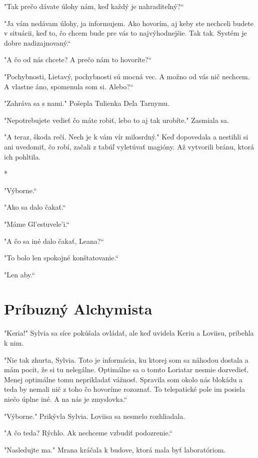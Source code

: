 \documentclass{book}
\begin{document}
"$ $Tak prečo dávate úlohy nám, keď každý je nahraditeľný?“

"$ $Ja vám nedávam úlohy, ja informujem. Ako hovorím, aj keby ste nechceli budete v situácii, keď to, čo chcem bude pre vás to najvýhodnejšie. Tak tak. Systém je dobre nadizajnovaný.“

"$ $A čo od nás chcete? A prečo nám to hovoríte?“

"$ $Pochybnosti, Lietavý, pochybnosti sú mocná vec. A možno od vás nič nechcem. A vlastne áno, spomenula som si. Alebo?“

"$ $Zahráva sa s nami."$ $ Pošepla Tulienka Deľa Tarnymu.

"$ $Nepotrebujete vedieť čo máte robiť, lebo to aj tak urobíte."$ $ Zasmiala sa.

"$ $A teraz, škoda rečí. Nech je k vám vír milosrdný."$ $ Keď dopovedala a nestihli si ani uvedomiť, čo robí, začali z tabúľ vyletúvať magióny. Až vytvorili bránu, ktorá ich pohltila.

\begin{center}
*
\end{center}

"$ $Výborne.“

"$ $Ako sa dalo čakať.“

"$ $Máme Gl'estuvele'i.“

"$ $A čo sa iné dalo čakať, Leana?“

"$ $To bolo len spokojné konštatovanie.“

"$ $Len aby.“

\chapter{Príbuzný Alchymista}

"$ $Keria!"$ $ Sylvia sa síce pokúšala ovládať, ale keď uvidela Keriu a Loviisu, pribehla k nim.

"$ $Nie tak zhurta, Sylvia. Toto je informácia, ku ktorej som sa náhodou dostala a mám pocit, že si tu nelegálne. Optimálne sa o tomto Loriatar nesmie dozvedieť. Menej optimálne tomu neprikladať vážnosť. Spravila som okolo nás blokádu a teda by nemali nič z toho čo hovoríme rozoznať. To telepatické pole im posiela niečo úplne iné. A na nás je zmyslovka.“

"$ $Výborne."$ $ Prikývla Sylvia. Loviisa sa nesmelo rozhliadala.

"$ $A čo teda? Rýchlo. Ak nechceme vzbudiť podozrenie.“

"$ $Nasledujte ma."$ $ Mrana kráčala k budove, ktorá mala byť laboratóriom.
\end{document}
